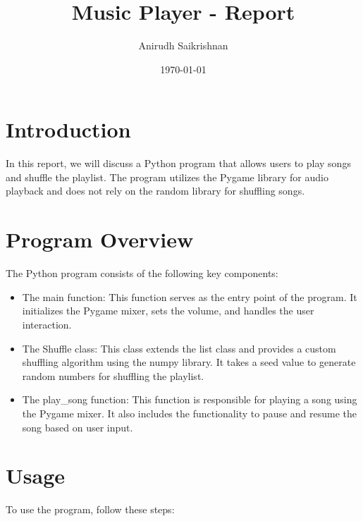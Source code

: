 \documentclass{article}
\title{Music Player - Report}
\author{Anirudh Saikrishnan}
\date{\today}
\begin{document}
\maketitle

\section{Introduction}
In this report, we will discuss a Python program that allows users to play songs and shuffle the playlist. The program utilizes the Pygame library for audio playback and does not rely on the random library for shuffling songs.

\section{Program Overview}
The Python program consists of the following key components:

\begin{itemize}
    \item The main function: This function serves as the entry point of the program. It initializes the Pygame mixer, sets the volume, and handles the user interaction.
    \item The Shuffle class: This class extends the list class and provides a custom shuffling algorithm using the numpy library. It takes a seed value to generate random numbers for shuffling the playlist.
    \item The play\_song function: This function is responsible for playing a song using the Pygame mixer. It also includes the functionality to pause and resume the song based on user input.
\end{itemize}

\section{Usage}
To use the program, follow these steps:
\end{document}
